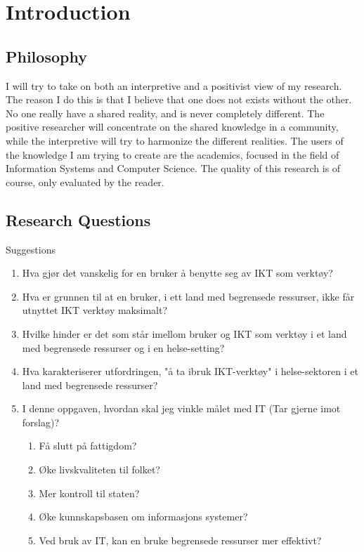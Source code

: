 \chapter{Introduction}
\section{Philosophy}
I will try to take on both an interpretive and a positivist view of my research.
The reason I do this is that I believe that one does not exists without the other.
No one really have a shared reality, and is never completely different.
The positive researcher will concentrate on the shared knowledge in a community, while the interpretive will try to harmonize the different realities. The users of the knowledge I am trying to create are the academics, focused in the field of Information Systems and Computer Science. The quality of this research is of course, only evaluated by the reader.
\section{Research Questions}
\large{Suggestions}
\begin{enumerate}
\item Hva gjør det vanskelig for en bruker å benytte seg av IKT som verktøy?
\item Hva er grunnen til at en bruker, i ett land med begrensede ressurser, ikke får utnyttet IKT verktøy maksimalt?
\item Hvilke hinder er det som står imellom bruker og IKT som verktøy i et land med begrensede ressurser og i en helse-setting?
\item Hva karakteriserer utfordringen, "å ta ibruk IKT-verktøy" i helse-sektoren i et land med begrensede ressurser?
\item I denne oppgaven, hvordan skal jeg vinkle målet med IT (Tar gjerne imot forslag)?
	\begin{enumerate}
	\item Få slutt på fattigdom?
	\item Øke livskvaliteten til folket?
	\item Mer kontroll til staten?
	\item Øke kunnskapsbasen om informasjons systemer?
	\item Ved bruk av IT, kan en bruke begrensede ressurser mer effektivt?
	\end{enumerate}
\end{enumerate}